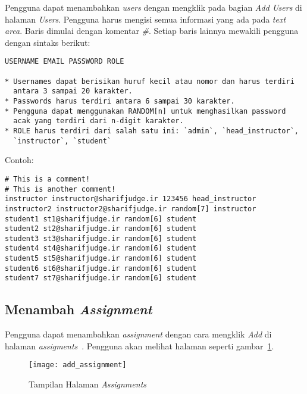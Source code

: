 Pengguna dapat menambahkan \textit{users} dengan mengklik pada bagian \textit{Add Users} di halaman \textit{Users}. Pengguna harus mengisi semua informasi yang ada pada \textit{text area}. Baris dimulai dengan komentar \textit{\#}. Setiap baris lainnya mewakili pengguna dengan sintaks berikut:
\begin{lstlisting}[basicstyle=\ttfamily, frame=single,
columns=fullflexible, keepspaces=true, breaklines=true]
USERNAME EMAIL PASSWORD ROLE
	
* Usernames dapat berisikan huruf kecil atau nomor dan harus terdiri 
  antara 3 sampai 20 karakter.
* Passwords harus terdiri antara 6 sampai 30 karakter.
* Pengguna dapat menggunakan RANDOM[n] untuk menghasilkan password 
  acak yang terdiri dari n-digit karakter.
* ROLE harus terdiri dari salah satu ini: `admin`, `head_instructor`, 
  `instructor`, `student`
\end{lstlisting}
Contoh:
\begin{lstlisting}[basicstyle=\ttfamily, frame=single,
columns=fullflexible, keepspaces=true, breaklines=true]
# This is a comment!
# This is another comment!
instructor instructor@sharifjudge.ir 123456 head_instructor
instructor2 instructor2@sharifjudge.ir random[7] instructor
student1 st1@sharifjudge.ir random[6] student
student2 st2@sharifjudge.ir random[6] student
student3 st3@sharifjudge.ir random[6] student
student4 st4@sharifjudge.ir random[6] student
student5 st5@sharifjudge.ir random[6] student
student6 st6@sharifjudge.ir random[6] student
student7 st7@sharifjudge.ir random[6] student
\end{lstlisting}

\subsection{Menambah \textit{Assignment}}
Pengguna dapat menambahkan \textit{assignment} dengan cara mengklik \textit{Add} di halaman \textit{assigments}~\cite{mjnaderi:14:sharifjudgedoc}. Pengguna akan melihat halaman seperti gambar~\ref{fig:addass}.
\begin{figure}[H]
	\centering  
	\texttt{[image: add\_assignment]}  
	\caption[Tampilan Halaman \textit{Assignments}]{Tampilan Halaman \textit{Assignments}} 
	\label{fig:addass} 
\end{figure} 

